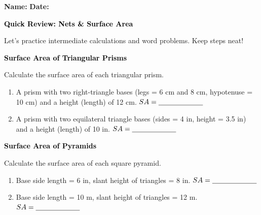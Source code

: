 \documentclass[12pt, letterpaper, fleqn]{article}
\newcommand{\blank}{\underline{\hspace{2.2cm}}}
\begin{document}
\textbf{Name:} \underline{\hspace{5cm}}
\hfill
\textbf{Date:} \underline{\hspace{3cm}}\\

\begin{tcolorbox}[colback=customteal!20]
    \large\textcolor{black}{\textbf{Quick Review: Nets \& Surface Area}}
\end{tcolorbox}

\vspace{3mm}
\noindent
Let's practice intermediate calculations and word problems. Keep steps neat!

\vspace{4mm}

\begin{tcolorbox}[colback=customteal!20]
\large\textcolor{black}{\textbf{Surface Area of Triangular Prisms}}
\end{tcolorbox}

\noindent
Calculate the surface area of each triangular prism.

\vspace{3mm}
\begin{enumerate}[itemsep=1.2cm, leftmargin=0.6cm]
\item A prism with two right-triangle bases (legs = 6 cm and 8 cm, hypotenuse = 10 cm) and a height (length) of 12 cm. $SA = \blank$
\vspace{1cm}
\item A prism with two equilateral triangle bases (sides = 4 in, height = 3.5 in) and a height (length) of 10 in. $SA = \blank$
\vspace{1cm}
\end{enumerate}
\newpage

\begin{tcolorbox}[colback=customteal!20]
\large\textcolor{black}{\textbf{Surface Area of Pyramids}}
\end{tcolorbox}

\noindent
Calculate the surface area of each square pyramid.

\vspace{3mm}
\begin{enumerate}[itemsep=1.2cm, leftmargin=0.6cm]
\item Base side length = 6 in, slant height of triangles = 8 in. $SA = \blank$
\vspace{1cm}
\item Base side length = 10 m, slant height of triangles = 12 m. $SA = \blank$
\vspace{1cm}
\end{enumerate}
\newpage
\end{document}
